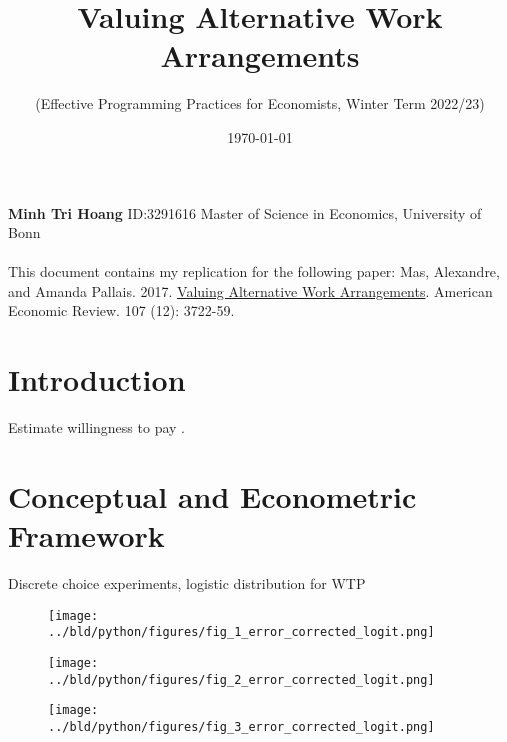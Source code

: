 \documentclass[11pt]{article}
\begin{document}
\title{\textbf{Valuing Alternative Work Arrangements}}
\author{(Effective Programming Practices for Economists, Winter Term 2022/23)}
\date{\today}

\maketitle
\textbf{Minh Tri Hoang} \textbar{} ID:3291616 \textbar{} Master of Science in Economics, University of Bonn \\ \\
This document contains my replication for the following paper: Mas, Alexandre, and Amanda Pallais. 2017. \href{https://www.aeaweb.org/articles?id=10.1257/aer.20161500}{Valuing Alternative Work Arrangements}. American Economic Review. 107 (12): 3722-59.

\tableofcontents

\pagebreak

\hypertarget{introduction}{%
\section{Introduction}\label{introduction}}

Estimate willingness to pay \cite{10.1257/aer.20161500}.

\hypertarget{Conceptual and Econometric Framework}{%
\section{Conceptual and Econometric Framework}\label{Conceptual and Econometric Framework}}

Discrete choice experiments, logistic distribution for WTP

\begin{figure}[h!]
    \centering
    \texttt{[image: ../bld/python/figures/fig\_1\_error\_corrected\_logit.png]}
    \caption{}
    \label{fig:logistic_regression}
    \end{figure}

\pagebreak

\begin{figure}[h!]
    \centering
    \texttt{[image: ../bld/python/figures/fig\_2\_error\_corrected\_logit.png]}
    \caption{}
    \label{fig:logistic_regression}
    \end{figure}

\pagebreak

\begin{figure}[h!]
    \centering
    \texttt{[image: ../bld/python/figures/fig\_3\_error\_corrected\_logit.png]}
    \caption{}
    \label{fig:logistic_regression}
    \end{figure}
\end{document}

